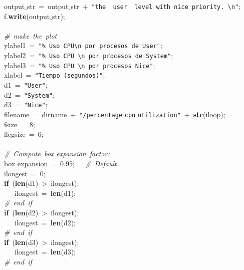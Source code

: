 \mbox{}\ \ \ output$\_$str\ =\ output$\_$str\ +\ \texttt{"{}the\ \ user\ \ level\ with\ nice\ priority.\ \textbackslash{}n"{}}; \\
\mbox{}\ \ \ f.\textbf{write}(output$\_$str); \\
\mbox{}\ \ \ \  \\
\mbox{}\ \ \ \textit{\#\ make\ the\ plot} \\
\mbox{}\ \ \ ylabel1\ =\ \texttt{"{}\%\ Uso\ CPU\textbackslash{}n\ por\ procesos\ de\ User"{}}; \\
\mbox{}\ \ \ ylabel2\ =\ \texttt{"{}\%\ Uso\ CPU\ \textbackslash{}n\ por\ procesos\ de\ System"{}}; \\
\mbox{}\ \ \ ylabel3\ =\ \texttt{"{}\%\ Uso\ CPU\ \textbackslash{}n\ por\ procesos\ Nice"{}}; \\
\mbox{}\ \ \ xlabel\ =\ \texttt{"{}Tiempo\ (segundos)"{}}; \\
\mbox{}\ \ \ d1\ =\ \texttt{"{}User"{}}; \\
\mbox{}\ \ \ d2\ =\ \texttt{"{}System"{}}; \\
\mbox{}\ \ \ d3\ =\ \texttt{"{}Nice"{}}; \\
\mbox{}\ \ \ filename\ =\ dirname\ +\ \texttt{"{}/percentage$\_$cpu$\_$utilization"{}}\ +\ \textbf{str}(iloop); \\
\mbox{}\ \ \ fsize\ =\ 8; \\
\mbox{}\ \ \ flegsize\ =\ 6; \\
\mbox{}\ \ \  \\
\mbox{}\ \ \ \textit{\#\ Compute\ box$\_$expansion\ factor:} \\
\mbox{}\ \ \ box$\_$expansion\ =\ 0.95;\ \ \ \textit{\#\ Default} \\
\mbox{}\ \ \ ilongest\ =\ 0; \\
\mbox{}\ \ \ \textbf{if}\ (\textbf{len}(d1)\ \textgreater{}\ ilongest): \\
\mbox{}\ \ \ \ \ \ ilongest\ =\ \textbf{len}(d1); \\
\mbox{}\ \ \ \textit{\#\ end\ if} \\
\mbox{}\ \ \ \textbf{if}\ (\textbf{len}(d2)\ \textgreater{}\ ilongest): \\
\mbox{}\ \ \ \ \ \ ilongest\ =\ \textbf{len}(d2); \\
\mbox{}\ \ \ \textit{\#\ end\ if} \\
\mbox{}\ \ \ \textbf{if}\ (\textbf{len}(d3)\ \textgreater{}\ ilongest): \\
\mbox{}\ \ \ \ \ \ ilongest\ =\ \textbf{len}(d3); \\
\mbox{}\ \ \ \textit{\#\ end\ if} \\
